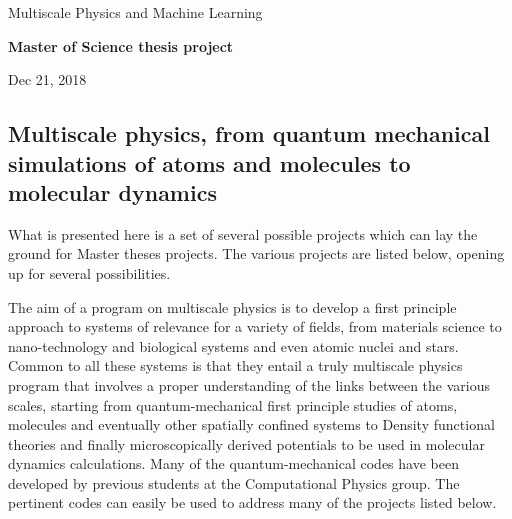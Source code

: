 \documentclass[%
oneside,                 %
final,                   %
10pt]{article}
\begin{document}

\newcommand{\exercisesection}[1]{\subsection*{#1}}






\thispagestyle{empty}

\begin{center}
{\LARGE\bf
\begin{spacing}{1.25}
Multiscale Physics and Machine Learning
\end{spacing}
}
\end{center}


\begin{center}
{\bf Master of Science thesis project${}^{}$} \\ [0mm]
\end{center}

\begin{center}
\end{center}
    

\begin{center}
Dec 21, 2018
\end{center}

\vspace{1cm}


\subsection{Multiscale physics, from quantum mechanical simulations of atoms and molecules to molecular dynamics}

What is presented here is a set of several possible  projects which can lay the ground for 
Master theses projects.  The various projects are listed below,
opening up for several possibilities.

The aim of a program on multiscale physics is to develop a first
principle approach to systems of relevance for a variety of fields,
from materials science to nano-technology and biological systems and
even atomic nuclei and stars.  Common to all these systems is that
they entail a truly multiscale physics program that involves a proper
understanding of the links between the various scales, starting from
quantum-mechanical first principle studies of atoms, molecules and
eventually other spatially confined systems to Density functional
theories and finally microscopically derived potentials to be used in
molecular dynamics calculations. Many of the quantum-mechanical codes have been developed by previous 
students at the Computational Physics group. The pertinent codes can easily be used to address many of the projects listed below.
\end{document}
